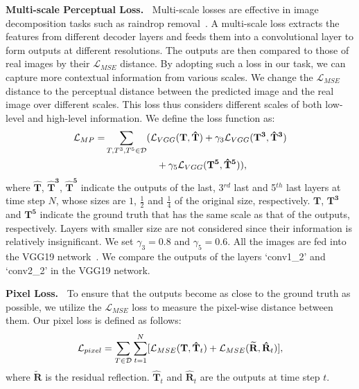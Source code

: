 \documentclass[10pt,twocolumn,letterpaper]{article}
\begin{document}
\noindent \textbf{Multi-scale Perceptual Loss.~}
Multi-scale losses are effective in image decomposition tasks such as raindrop removal~\cite{qian2018attentive}. A multi-scale loss extracts the features from different decoder layers and feeds them into a convolutional layer to form outputs at different resolutions. The outputs are then compared to those of real images by their $\mathcal{L}_{MSE}$ distance. By adopting such a loss in our task, we can capture more contextual information from various scales. We change the $\mathcal{L}_{MSE}$ distance to the perceptual distance between the predicted image and the real image over different scales. This loss thus considers different scales of both low-level and high-level information. 
We define the loss function as:
\begin{equation}
\vspace{-0.2em}
\label{eq_g}
\begin{split}
\mathcal{L}_{MP} =&\sum_{T, T^3, T^5\in \mathcal{D}} (\mathcal{L}_{VGG}(\mathbf{T}, \mathbf{\hat{T}}) +\gamma_3  \mathcal{L}_{VGG}(\mathbf{T^3},\mathbf{\hat{T}^3})\\
             &~~~~~~~~~~~~~~~~+ \gamma_5 \mathcal{L}_{VGG}(\mathbf{T^5}, \mathbf{\hat{T}^5})),
\end{split}
\vspace{-1.2em}
\end{equation}
where $\mathbf{\hat{T}}$, $\mathbf{\hat{T}^3}$, $\mathbf{\hat{T}^5}$ indicate the outputs of the last, 3$^{rd}$ last and 5$^{th}$ last layers at time step $N$, whose sizes are $1$, $\frac{1}{2}$ and $\frac{1}{4}$ of the original size, respectively. $\mathbf{T}$, $\mathbf{T^3}$ and $\mathbf{T^5}$ indicate the ground truth that has the same scale as that of the outputs, respectively. Layers with smaller size are not considered since their information is relatively insignificant. We set $\gamma_3 = 0.8$ and $\gamma_5 = 0.6$. All the images are fed into the VGG19 network~\cite{simonyan2014very}. We compare the outputs of the layers `conv1\_2' and `conv2\_2’ in the VGG19 network.

\noindent \textbf{Pixel Loss.~}
To ensure that the outputs become as close to the ground truth as possible, we utilize the $\mathcal{L}_{MSE}$ loss to measure the pixel-wise distance between them. Our pixel loss is defined as follows: 
\begin{equation}
\vspace{-0.2em}
\mathcal{L}_{pixel}= \sum_{T\in \mathcal{D}} {\sum\limits^{N}_{t = 1} [\mathcal{L}_{MSE}(\mathbf{T}, \mathbf{\hat{T}}_t)+ \mathcal{L}_{MSE}(\mathbf{\widetilde{R}}, \mathbf{\hat{R}}_t)]},
\vspace{-0.2em}
\end{equation}
where $\mathbf{\widetilde{R}}$ is the residual reflection. $\mathbf{\hat{T}}_t$ and $\mathbf{\hat{R}}_t$ are the outputs at time step $t$.
\end{document}
